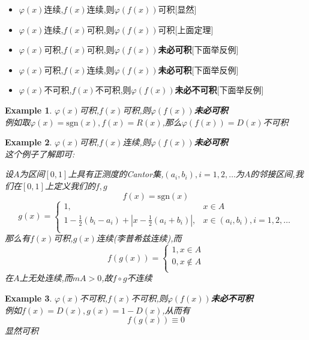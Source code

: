 \documentclass[11pt,hyperref,a4paper,UTF8]{ctexart}
\newtheorem{example}{Example}[subsection]
\newcommand{\abs}[1]{\left|#1\right|}
\begin{document}
\begin{CJK}{UTF8}{gkai}
\begin{itemize}
  \item $\varphi(x)$连续,$f(x)$连续,则$\varphi(f(x))$可积[显然]
  \item $\varphi(x)$连续,$f(x)$可积,则$\varphi(f(x))$可积[上面定理]
  \item $\varphi(x)$可积,$f(x)$可积,则$\varphi(f(x))$\textbf{未必可积}[下面举反例]
  \item $\varphi(x)$可积,$f(x)$连续,则$\varphi(f(x))$\textbf{未必可积}[下面举反例]
  \item $\varphi(x)$不可积,$f(x)$不可积,则$\varphi(f(x))$\textbf{未必不可积}[下面举反例]
\end{itemize}

\begin{example}
  $\varphi(x)$可积,$f(x)$可积,则$\varphi(f(x))$\textbf{未必可积}\\

  例如取$\varphi(x) = \text{sgn}(x), f(x) = R(x)$,那么$\varphi(f(x)) = D(x)$不可积
\end{example}

\begin{example}
  $\varphi(x)$可积,$f(x)$连续,则$\varphi(f(x))$\textbf{未必可积}\\

  这个例子了解即可:

  设$A$为区间$[0,1]$上具有正测度的Cantor集,$(a_i,b_i), i = 1,2,\ldots$为$A$的邻接区间,我们在$[0,1]$上定义我们的$f,g$
  \[f(x) = \text{sgn}(x)\]
  \[g(x) = \begin{cases}
    1,&x \in A\\
    1 - \frac{1}{2}(b_i - a_i) + \abs{x - \frac{1}{2}(a_i + b_i)}, &x \in (a_i,b_i), i = 1,2,\ldots\\
  \end{cases}
  \]
  那么有$f(x)$可积,$g(x)$连续(李普希兹连续),而
  \[f(g(x)) = \begin{cases}
    1,x \in A\\
    0,x \notin A\\
  \end{cases}\]
  在$A$上无处连续,而$m A > 0$,故$f \circ g$不连续
\end{example}

\begin{example}
  $\varphi(x)$不可积,$f(x)$不可积,则$\varphi(f(x))$\textbf{未必不可积}\\

  例如$f(x) = D(x), g(x) = 1 - D(x)$,从而有
  \[f(g(x)) \equiv 0\]
  显然可积
\end{example}


\end{CJK}
\end{document}
